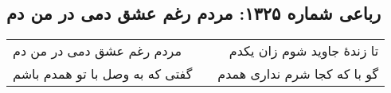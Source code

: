 \begin{center}
\section*{رباعی شماره ۱۳۲۵: مردم رغم عشق دمی در من دم}
\label{sec:1325}
\begin{longtable}{l p{0.5cm} r}
مردم رغم عشق دمی در من دم
&&
تا زندهٔ جاوید شوم زان یکدم
\\
گفتی که به وصل با تو همدم باشم
&&
گو با که کجا شرم نداری همدم
\\
\end{longtable}
\end{center}
